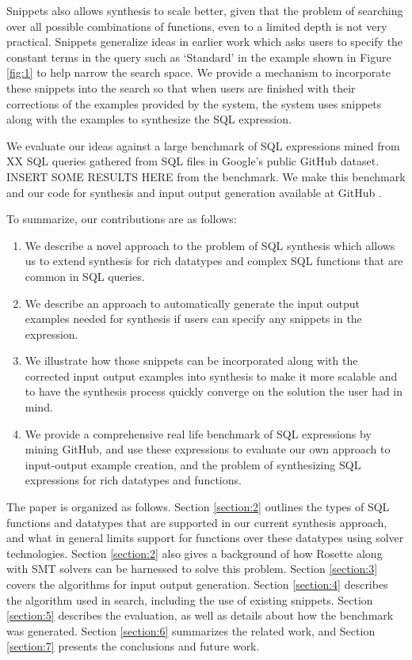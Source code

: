Snippets also allows synthesis to scale better, given that the problem of searching over all possible combinations of functions, even to a limited depth is not very practical.  Snippets generalize ideas in earlier work \cite{BodikPLDI} which asks users to specify the constant terms in the query such as `Standard' in the example shown in Figure \ref{fig:1} to help narrow the search space.  We provide a mechanism to incorporate these snippets into the search so that when users are finished with their corrections of the examples provided by the system, the system uses snippets along with the examples to synthesize the SQL expression.

We evaluate our ideas against a large benchmark of SQL expressions mined from XX SQL queries gathered from SQL files in Google's public GitHub \cite{GitHub_repo} dataset.  INSERT SOME RESULTS HERE from the benchmark.  We make this benchmark and our code for synthesis and input output generation available at GitHub \cite{Quetzal}.

To summarize, our contributions are as follows:
\begin{enumerate}
\item We describe a novel approach to the problem of SQL synthesis which allows us to extend synthesis for rich datatypes and complex SQL functions that are common in SQL queries.
\item We describe an approach to automatically generate the input output examples needed for synthesis if users can specify any snippets in the expression.  
\item We illustrate how those snippets can be incorporated along with the corrected input output examples into synthesis to make it more scalable and to have the synthesis process quickly converge on the solution the user had in mind.
\item We provide a comprehensive real life benchmark of SQL expressions by mining GitHub, and use these expressions to evaluate our own approach to input-output example creation, and the problem of synthesizing SQL expressions for rich datatypes and functions.
\end{enumerate}

The paper is organized as follows.  Section \ref{section:2} outlines the types of SQL functions and datatypes that are supported in our current synthesis approach, and what in general limits support for functions over these datatypes using solver technologies.  Section \ref{section:2} also gives a background of how Rosette along with SMT solvers can be harnessed to solve this problem.  Section \ref{section:3} covers the algorithms for input output generation.  Section \ref{section:4} describes the algorithm used in search, including the use of existing snippets.  Section \ref{section:5} describes the evaluation, as well as details about how the benchmark was generated.  Section \ref{section:6} summarizes the related work, and Section \ref{section:7} presents the conclusions and future work.


